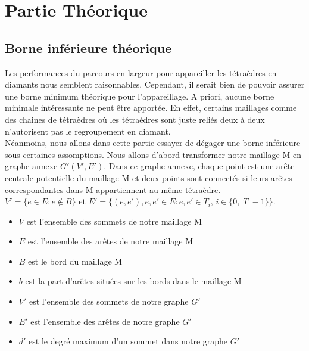 \section{Partie Théorique}
\subsection{Borne inférieure théorique}
\noindent
Les performances du parcours en largeur pour appareiller les tétraèdres en diamants nous semblent raisonnables. Cependant, il serait bien de pouvoir assurer une borne minimum théorique pour l'appareillage. A priori, aucune borne minimale intéressante ne peut être apportée. En effet, certains maillages comme des chaines de tétraèdres où les tétraèdres sont juste reliés deux à deux n'autorisent pas le regroupement en diamant.\\
Néanmoins, nous allons dans cette partie essayer de dégager une borne inférieure sous certaines assomptions. Nous allons d'abord transformer notre maillage M en graphe annexe $G'(V',E')$. Dans ce graphe annexe, chaque point est une arête centrale potentielle du maillage M et deux points sont connectés si leurs arêtes correspondantes dans M appartiennent au même tétraèdre.\\
$V' = \{e\in E : e\notin B\}$ et $E'=\{(e,e'), e,e'\in E : e,e' \in T_i, \,  i\in \{0,|T|-1\}\}$.
\begin{itemize}
\item $V$ est l'ensemble des sommets de notre maillage M
\item $E$ est l'ensemble des arêtes de notre maillage M
\item $B$ est le bord du maillage M
\item $b$ est la part d'arêtes situées sur les bords dans le maillage M
\item $V'$ est l'ensemble des sommets de notre graphe $G'$
\item $E'$ est l'ensemble des arêtes de notre graphe $G'$
\item $d'$ est le degré maximum d'un sommet dans notre graphe $G'$
\end{itemize}

